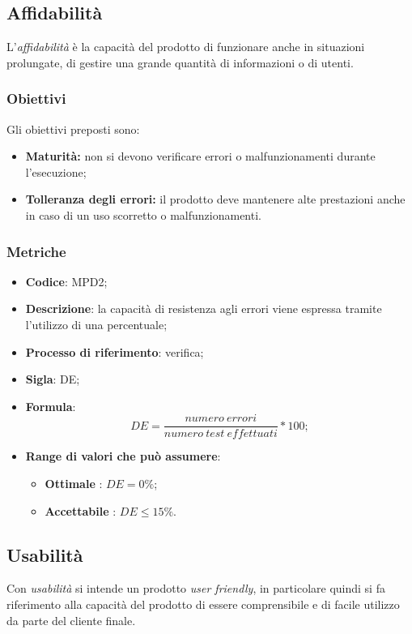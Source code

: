 \subsection{Affidabilità}
L'\textit{affidabilità} è la capacità del prodotto di funzionare anche in situazioni prolungate, di gestire una grande quantità di informazioni o di utenti.
\subsubsection{Obiettivi}
Gli obiettivi preposti sono:
\begin {itemize}
	\item \textbf{Maturità:} non si devono verificare errori o malfunzionamenti durante l'esecuzione;
	\item \textbf{Tolleranza degli errori:} il prodotto deve mantenere alte prestazioni anche in caso di un uso scorretto o malfunzionamenti.
\end{itemize}
\subsubsection{Metriche}
\vspace{-1cm}
\begin{itemize}
	\item \textbf{Codice}: MPD2;
	\item \textbf{Descrizione}: la capacità di resistenza agli errori viene espressa tramite l'utilizzo di una percentuale;
	\item \textbf{Processo di riferimento}: verifica;
	\item \textbf{Sigla}: DE;
	\item \textbf{Formula}: \[DE=\frac{numero \ errori}{numero \ test \ effettuati}\ast100;\]
	\item \textbf{Range di valori che può assumere}: 
		\begin{itemize}
			\item \textbf{Ottimale} : $DE = 0 \%$;
			\item \textbf{Accettabile} : $DE \leq 15 \%$.
		\end{itemize}
\end{itemize}

\subsection{Usabilità}
Con \textit{usabilità} si intende un prodotto \textit{user friendly}, in particolare quindi si fa riferimento alla capacità del prodotto di essere comprensibile e di facile utilizzo da parte del cliente finale.


